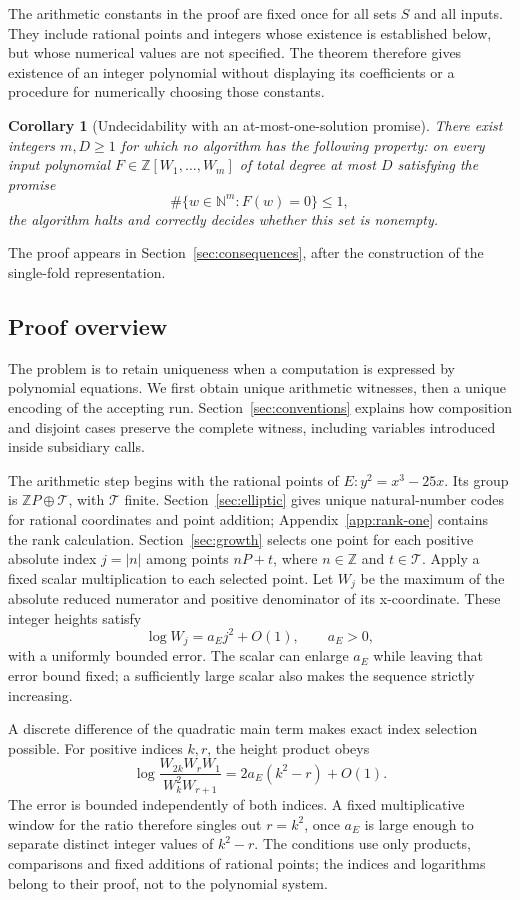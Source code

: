 \documentclass[11pt]{article}
\newtheorem{corollary}[theorem]{Corollary}
\theoremstyle{definition}
\theoremstyle{remark}
\newcommand{\NN}{\mathbb N}
\newcommand{\ZZ}{\mathbb Z}
\begin{document}
The arithmetic constants in the proof are fixed once for all sets $S$ and
all inputs. They include rational points and integers whose existence is
established below, but whose numerical values are not specified. The theorem
therefore gives existence of an integer polynomial without displaying its
coefficients or a procedure for numerically choosing those constants.

\begin{corollary}[Undecidability with an at-most-one-solution promise]
\label{cor:unique-h10}
There exist integers $m,D\ge1$ for which no algorithm has the following
property: on every input polynomial $F\in\ZZ[W_1,\ldots,W_m]$ of total
degree at most $D$ satisfying the promise
\[
 \#\{w\in\NN^m:F(w)=0\}\le1,
\]
the algorithm halts and correctly decides whether this set is nonempty.
\end{corollary}
The proof appears in Section~\ref{sec:consequences}, after the construction
of the single-fold representation.

\subsection{Proof overview}
The problem is to retain uniqueness when a computation is expressed by
polynomial equations. We first obtain unique arithmetic witnesses, then a
unique encoding of the accepting run. Section~\ref{sec:conventions} explains
how composition and disjoint cases preserve the complete witness, including
variables introduced inside subsidiary calls.

The arithmetic step begins with the rational points of
$E:y^2=x^3-25x$. Its group is $\ZZ P\oplus\mathcal T$, with $\mathcal T$
finite. Section~\ref{sec:elliptic} gives unique natural-number codes for
rational coordinates and point addition; Appendix~\ref{app:rank-one}
contains the rank calculation. Section~\ref{sec:growth} selects one point
for each positive absolute index $j=|n|$ among points $nP+t$, where
$n\in\ZZ$ and $t\in\mathcal T$. Apply a fixed scalar multiplication to
each selected point. Let $W_j$ be the maximum of the absolute reduced
numerator and positive denominator of its x-coordinate. These integer
heights satisfy
\[
 \log W_j=a_Ej^2+O(1),\qquad a_E>0,
\]
with a uniformly bounded error. The scalar can enlarge $a_E$ while leaving
that error bound fixed; a sufficiently large scalar also makes the sequence
strictly increasing.

A discrete difference of the quadratic main term makes exact index
selection possible. For positive indices $k,r$, the height product obeys
\[
 \log\frac{W_{2k}W_rW_1}{W_k^2W_{r+1}}
      =2a_E(k^2-r)+O(1).
\]
The error is bounded independently of both indices. A fixed multiplicative
window for the ratio therefore singles out $r=k^2$, once $a_E$ is large
enough to separate distinct integer values of $k^2-r$. The conditions use
only products, comparisons and fixed additions of rational points; the
indices and logarithms belong to their proof, not to the polynomial system.
\end{document}
